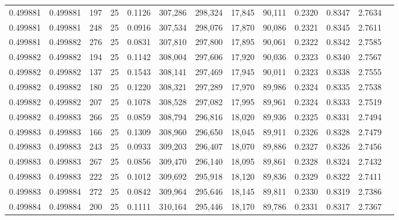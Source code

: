 \begin{tabular}{rrrrrrrrrrrrr}
0.499881 & 0.499881 &   197 &  25 &                                     0.1126 & 307,286 & 298,324 &  17,845 &  90,111 & 0.2320 & 0.8347 & 2.7634 \\
0.499881 & 0.499881 &   248 &  25 &                                     0.0916 & 307,534 & 298,076 &  17,870 &  90,086 & 0.2321 & 0.8345 & 2.7611 \\
0.499881 & 0.499882 &   276 &  25 &                                     0.0831 & 307,810 & 297,800 &  17,895 &  90,061 & 0.2322 & 0.8342 & 2.7585 \\
0.499882 & 0.499882 &   194 &  25 &                                     0.1142 & 308,004 & 297,606 &  17,920 &  90,036 & 0.2323 & 0.8340 & 2.7567 \\
0.499882 & 0.499882 &   137 &  25 &                                     0.1543 & 308,141 & 297,469 &  17,945 &  90,011 & 0.2323 & 0.8338 & 2.7555 \\
0.499882 & 0.499882 &   180 &  25 &                                     0.1220 & 308,321 & 297,289 &  17,970 &  89,986 & 0.2324 & 0.8335 & 2.7538 \\
0.499882 & 0.499882 &   207 &  25 &                                     0.1078 & 308,528 & 297,082 &  17,995 &  89,961 & 0.2324 & 0.8333 & 2.7519 \\
0.499882 & 0.499883 &   266 &  25 &                                     0.0859 & 308,794 & 296,816 &  18,020 &  89,936 & 0.2325 & 0.8331 & 2.7494 \\
0.499883 & 0.499883 &   166 &  25 &                                     0.1309 & 308,960 & 296,650 &  18,045 &  89,911 & 0.2326 & 0.8328 & 2.7479 \\
0.499883 & 0.499883 &   243 &  25 &                                     0.0933 & 309,203 & 296,407 &  18,070 &  89,886 & 0.2327 & 0.8326 & 2.7456 \\
0.499883 & 0.499883 &   267 &  25 &                                     0.0856 & 309,470 & 296,140 &  18,095 &  89,861 & 0.2328 & 0.8324 & 2.7432 \\
0.499883 & 0.499883 &   222 &  25 &                                     0.1012 & 309,692 & 295,918 &  18,120 &  89,836 & 0.2329 & 0.8322 & 2.7411 \\
0.499883 & 0.499884 &   272 &  25 &                                     0.0842 & 309,964 & 295,646 &  18,145 &  89,811 & 0.2330 & 0.8319 & 2.7386 \\
0.499884 & 0.499884 &   200 &  25 &                                     0.1111 & 310,164 & 295,446 &  18,170 &  89,786 & 0.2331 & 0.8317 & 2.7367 \\

\end{tabular}

